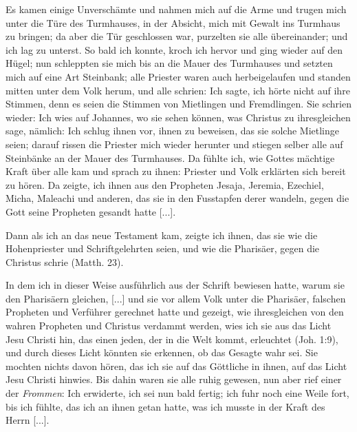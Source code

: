 Es kamen einige Unverschämte und nahmen mich auf die
Arme und trugen mich unter die Türe des Turmhauses, in der
Absicht, mich mit Gewalt ins Turmhaus zu bringen; da aber
die Tür geschlossen war, purzelten sie alle übereinander; und ich
lag zu unterst. So bald ich konnte, kroch ich hervor und ging wieder
auf den Hügel; nun schleppten sie mich bis an die Mauer
des Turmhauses und setzten mich auf eine Art Steinbank; alle
Priester waren auch herbeigelaufen und standen mitten unter dem
Volk herum, und alle schrien:  Ich sagte,
ich hörte nicht auf ihre Stimmen, denn es seien die Stimmen von
Mietlingen und Fremdlingen. Sie schrien wieder:  Ich wies auf Johannes, wo sie sehen können, was
Christus zu ihresgleichen sage, nämlich:  Ich schlug ihnen vor, ihnen zu beweisen,
das sie solche Mietlinge seien; darauf rissen die Priester mich
wieder herunter und stiegen selber alle auf Steinbänke
an der Mauer des Turmhauses. Da fühlte ich, wie Gottes
mächtige Kraft über alle kam und sprach zu ihnen:  Priester und Volk erklärten sich bereit
zu hören. Da zeigte, ich ihnen aus den Propheten Jesaja,
Jeremia, Ezechiel, Micha, Maleachi und anderen, das sie in den
Fusstapfen derer wandeln, gegen die Gott seine Propheten 
gesandt hatte [...].


Dann als ich an das neue Testament kam, zeigte ich ihnen,
das sie wie die Hohenpriester und Schriftgelehrten seien, und
wie die Pharisäer, gegen die Christus  schrie 
(Matth. 23).


In dem ich in dieser Weise ausführlich aus der Schrift bewiesen
hatte, warum sie den Pharisäern gleichen, [...] und sie vor allem
Volk unter die Pharisäer, falschen Propheten und Verführer
gerechnet hatte und gezeigt, wie ihresgleichen von den wahren
Propheten und Christus verdammt werden, wies ich sie aus das
Licht Jesu Christi hin, das einen jeden, der in die Welt kommt,
erleuchtet (Joh. 1:9), und durch 
dieses Licht könnten sie erkennen,
ob das Gesagte wahr sei. Sie mochten nichts 
davon hören, das
ich sie auf das Göttliche in ihnen, auf das Licht Jesu Christi
hinwies. Bis dahin waren sie alle 
ruhig gewesen, nun aber
rief einer der \textit{Frommen}:  
Ich erwiderte, ich sei nun bald fertig; ich fuhr noch eine Weile
fort, bis ich fühlte, das ich an ihnen getan hatte, was ich musste
in der Kraft des Herrn [...]. 

